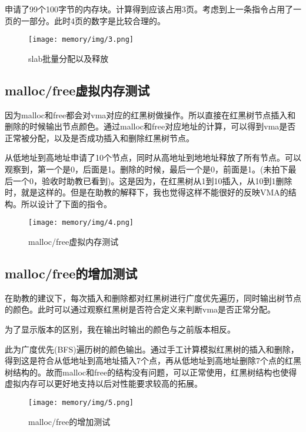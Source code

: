 申请了99个100字节的内存块。计算得到应该占用3页。考虑到上一条指令占用了一页的一部分。此时4页的数字是比较合理的。

\begin{figure}[H]
  \centering
  \texttt{[image: memory/img/3.png]}
  \caption{slab批量分配以及释放}
\end{figure}

\subsection{malloc/free虚拟内存测试}

因为malloc和free都会对vma对应的红黑树做操作。所以直接在红黑树节点插入和删除的时候输出节点颜色。通过malloc和free对应地址的计算，可以得到vma是否正常被分配，以及是否成功插入和删除红黑树节点。

从低地址到高地址申请了10个节点，同时从高地址到地地址释放了所有节点。可以观察到，第一个是0，后面是1。删除的时候，最后一个是0，前面是1。(未拍下最后一个0，验收时助教已看到)。这是因为，在红黑树从1到10插入，从10到1删除时，就是这样的。但是在助教的解释下，我也觉得这样不能很好的反映VMA的结构。所以设计了下面的指令。

\begin{figure}[H]
  \centering
  \texttt{[image: memory/img/4.png]}
  \caption{malloc/free虚拟内存测试}
\end{figure}

\subsection{malloc/free的增加测试}

在助教的建议下，每次插入和删除都对红黑树进行广度优先遍历，同时输出树节点的颜色。此时可以通过观察红黑树是否符合定义来判断vma是否正常分配。

为了显示版本的区别，我在输出时输出的颜色与之前版本相反。

此为广度优先(BFS)遍历树的颜色输出。通过手工计算模拟红黑树的插入和删除，得到这是符合从低地址到高地址插入7个点，再从低地址到高地址删除7个点的红黑树结构的。故而malloc和free的结构没有问题，可以正常使用，红黑树结构也使得虚拟内存可以更好地支持以后对性能要求较高的拓展。

\begin{figure}[H]
  \centering
  \texttt{[image: memory/img/5.png]}
  \caption{malloc/free的增加测试}
\end{figure}

